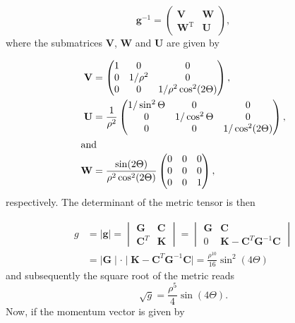 \begin{equation}
\mathbf{g}^{-1}=
\begin{pmatrix}
\mathbf{V} & \mathbf{W}\\
\mathbf{W}^\mathrm{T} & \mathbf{U}
\end{pmatrix},
\end{equation}
where the submatrices $\mathbf{V}$, $\mathbf{W}$ and $\mathbf{U}$ are given by

\begin{align}
\mathbf{V} &=
\begin{pmatrix}
1 & 0      & 0\\
0 & 1/\rho^2 & 0\\
0 & 0      & 1/\rho^2\cos^2(2\Theta)
\end{pmatrix},\\
\mathbf{U} &=
\frac{1}{\rho^2}
\begin{pmatrix}
1/\sin^2\Theta & 0            & 0\\
0            & 1/\cos^2\Theta & 0\\
0            & 0            & 1/\cos^2(2\Theta)
\end{pmatrix},\\
\intertext{and}
\mathbf{W} &=
\frac{\sin(2\Theta)}{\rho^2\cos^2(2\Theta)}
\begin{pmatrix}
0 & 0 & 0\\
0 & 0 & 0\\
0 & 0 & 1
\end{pmatrix},
\end{align}
respectively. The determinant of the metric tensor is then

\begin{align}
g &=
\mid\mathbf{g}\mid=
\begin{vmatrix}
\mathbf{G} & \mathbf{C}\\
\mathbf{C}^T & \mathbf{K}
\end{vmatrix}
=
\begin{vmatrix}
\mathbf{G} & \mathbf{C}\\
0 & \mathbf{K} - \mathbf{C}^T \mathbf{G}^{-1} \mathbf{C}
\end{vmatrix}\\
&=
\mid \mathbf{G} \mid \cdot \mid\mathbf{K} - \mathbf{C}^T \mathbf{G}^{-1} \mathbf{C} \mid
=
\frac{\rho^{10}}{16}\sin^2(4\Theta)
\end{align}
and subsequently the square root of the metric reads
\begin{equation}
\sqrt{g}=\frac{\rho^5}{4}\sin(4\Theta).
\end{equation}
Now, if the momentum vector is given by

